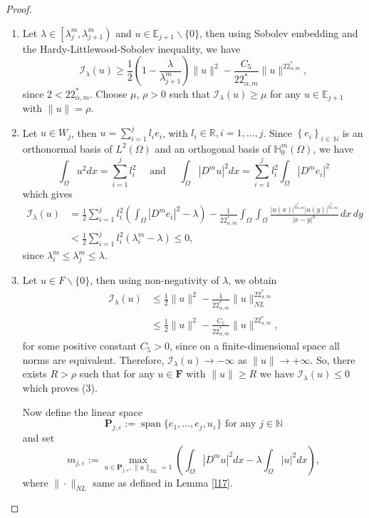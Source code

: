 \documentclass[reqno]{amsart}
\newcommand{\DD} {\displaystyle}
\newcommand{\la} {\lambda}
\newcommand{\eps}{\varepsilon}
\newcommand{\Om}{\Omega}
\newcommand{\al} {\alpha}
\newcommand{\noi} {  \noindent}
\newcommand{\mb} {\mathbb}
\newcommand{\mc} {\mathcal}
\numberwithin{theorem}{section} \numberwithin{equation}{section}
\begin{document}
\begin{proof}
\begin{enumerate}\item Let $\la \in\left[\la^m_j, \la^m_{j+1}\right)$ and $u \in \mb{E}_{j+1} \backslash\{0\}$, then using Sobolev embedding and the Hardy-Littlewood-Sobolev inequality, we have
\begin{equation*}
\mc{I}_\la(u) \geq\frac{1}{2}\left(1-\frac{\la}{\la^m_{j+1}}\right)\| u \|^2 -\frac{C_5}{22^*_{\al, m}}\| u \|^{22^*_{\al, m}},
\end{equation*}
since $2<22_{\al, m}^*$. Choose $\mu$, $\rho>0$ such that $\mc{I}_\la(u) \geq \mu$ for any $u \in \mb{E}_{j+1}$ with $\|u\|=\rho$.
\item Let $u \in {W}_j$, then $u=\sum_{i=1}^j l_i e_i$, with $l_i \in \mb {R}, i=1, \ldots, j$. Since $\left\{e_i\right\}_{i \in \mb {~N}}$ is an orthonormal basis of $L^2(\Om)$ and an orthogonal basis of $\mb{H}_0^m(\Om)$, we have
\[
\int_{\Om} u^2 d x=\sum_{i=1}^j l_i^2 \quad \text { and } \quad \int_{\Om}|D^m u|^2 d x=\sum_{i=1}^j l_i^2\int_{\Om}|D^{m} e_i|^2
\]
which gives
\begin{align*}
\mc{I}_\la(u) & =\frac{1}{2} \sum_{i=1}^j l_i^2\left(\DD\int_{\Om}|D^{m}e_i|^2-\la\right)-\frac{1}{22_{\al, m}^*} \int_{\Om} \int_{\Om} \frac{|u(x)|^{2_{\al, m}^*}|u(y)|^{2_{\al, m}^*}}{|x-y|^\al} \, dx \, dy \\
& <\frac{1}{2} \sum_{i=1}^j l_i^2\left(\la^m_i-\la\right)\leq 0,
\end{align*}
since $\la^m_i\leq\la^m_j\leq\la$.
\item Let $u \in F \backslash\{0\}$, then using non-negativity of $\la$, we obtain
\begin{align*}
\mc{I}_\la(u) & \leq \frac{1}{2}\|u\|^2-\frac{1}{22_{\al, m}^*}\|u\|_{N L}^{22_{\al, m}^*} \\
& \leq \frac{1}{2}\|u\|^2-\frac{C_5}{22_{\al, m}^*}\|u\|^{22_{\al, m}^*},
\end{align*}
for some positive constant $C_5>0$, since on a finite-dimensional space all norms are equivalent. Therefore, $\mc{I}_\la(u) \rightarrow-\infty$ as $\|u\| \rightarrow+\infty$. So, there exists $R>\rho$ such that for any $u \in \mathbf{F}$ with $\|u\| \geq R$ we have $\mc{I}_\la(u) \leq 0$ which proves (3).\\
\vspace{0.01cm}

\noi Now define the linear space
\[\mathbf{P}_{j, \eps}:=\operatorname{span}\{e_1, \ldots, e_j, u_\eps\} \text { for any } j \in \mb{N}\]
and set
\[m_{j, \eps}:=\max _{u \in \mathbf{P}_{j, \eps}, \|u\|_{NL}=1}\left(\int_{\Om}|D^m u|^2 d x-\la \int_{\Om}|u|^2 d x\right),\]
where $\|\cdot\|_{NL}$ same as defined in Lemma \ref{l17}.
\end{enumerate}\end{proof}
\end{document}
